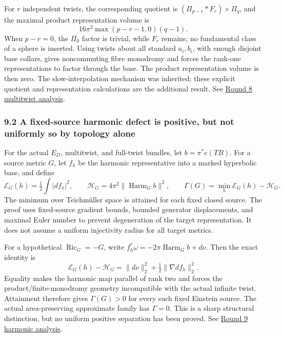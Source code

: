 \documentclass[
  english,
]{article}
\begin{document}
For \(r\) independent twists, the corresponding quotient is
\((\Pi_{p-r}*F_r)\times\Pi_q\), and the maximal product representation
volume is \[
 16\pi^2\max(p-r-1,0)(q-1).
\] When \(p-r=0\), the \(\Pi_0\) factor is trivial, while \(F_r\)
remains; no fundamental class of a sphere is inserted. Using twists
about all standard \(a_i,b_i\), with enough disjoint base collars, gives
noncommuting fibre monodromy and forces the rank-one representations to
factor through the base. The product representation volume is then zero.
The slow-interpolation mechanism was inherited; these explicit quotient
and representation calculations are the additional result. See
\href{../proofs/round8_multitwist.md}{Round 8 multitwist analysis}.

\hypertarget{a-fixed-source-harmonic-defect-is-positive-but-not-uniformly-so-by-topology-alone}{%
\subsubsection{9.2 A fixed-source harmonic defect is positive, but not
uniformly so by topology
alone}\label{a-fixed-source-harmonic-defect-is-positive-but-not-uniformly-so-by-topology-alone}}

For the actual \(E_D\), multitwist, and full-twist bundles, let
\(b=\pi^*e(TB)\). For a source metric \(G\), let \(f_h\) be the harmonic
representative into a marked hyperbolic base, and define \[
 \mathcal E_G(h)=\tfrac12\int|df_h|^2,\qquad
 \mathcal H_G=4\pi^2\|\operatorname{Harm}_G b\|^2,\qquad
 \Gamma(G)=\min_h\mathcal E_G(h)-\mathcal H_G.
\] The minimum over Teichmüller space is attained for each fixed closed
source. The proof uses fixed-source gradient bounds, bounded generator
displacements, and maximal Euler number to prevent degeneration of the
target representation. It does not assume a uniform injectivity radius
for all target metrics.

For a hypothetical \(\operatorname{Ric}_G=-G\), write
\(f_h^*\omega=-2\pi\operatorname{Harm}_G b+d\nu\). Then the exact
identity is \[
 \mathcal E_G(h)-\mathcal H_G
 =\|d\nu\|_2^2+\tfrac12\|\nabla df_h\|_2^2.
\] Equality makes the harmonic map parallel of rank two and forces the
product/finite-monodromy geometry incompatible with the actual infinite
twist. Attainment therefore gives \(\Gamma(G)>0\) for every such fixed
Einstein source. The actual area-preserving approximate family has
\(\Gamma=0\). This is a sharp structural distinction, but no uniform
positive separation has been proved. See
\href{../proofs/round9_bundle.md}{Round 9 harmonic analysis}.
\end{document}
